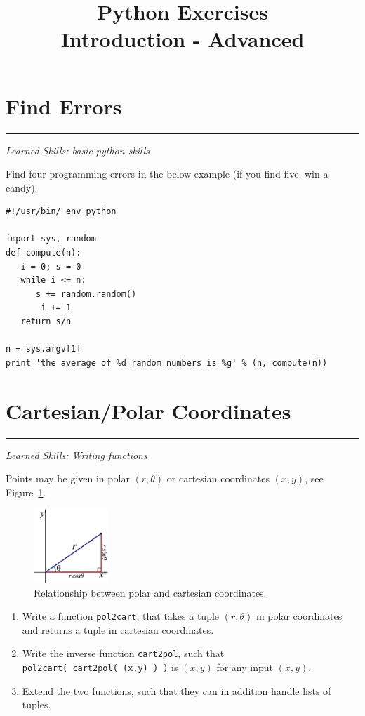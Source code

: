 \documentclass[smallheadings,12pt]{scrartcl}
\newcommand{\skills}[1]{\rule{1cm}{0pt}{\begin{minipage}{.8\textwidth}\small\em
      Learned Skills:  #1\end{minipage}}}
\begin{document}
\parindent0cm
\title{Python Exercises\\ Introduction - Advanced}
\lstset{language=Python,numbers=left,frame=shadowbox}
\date{}
\maketitle

\section{Find Errors}
\skills{basic python skills}

Find four programming errors in the below example (if you find five,
win a candy).
\begin{lstlisting}
#!/usr/bin/ env python

import sys, random
def compute(n):
   i = 0; s = 0
   while i <= n:
      s += random.random()
       i += 1
   return s/n

n = sys.argv[1]
print 'the average of %d random numbers is %g' % (n, compute(n))
\end{lstlisting}


\section{Cartesian/Polar Coordinates}
\skills{Writing functions}

Points may be given in polar $(r,\theta)$ or cartesian coordinates
$(x,y)$, see Figure~\ref{fig:pol2cart}.
\begin{figure}[H]
  \centering
  \includegraphics[width=0.25\textwidth]{pics/pol2cart.eps}
  \caption{Relationship between polar and cartesian coordinates.\label{fig:pol2cart}}
\end{figure}

\begin{enumerate}
\item Write a function \texttt{pol2cart}, that takes a tuple $(r,\theta)$ in polar
  coordinates and returns a tuple in cartesian coordinates. 
\item Write the inverse function \texttt{cart2pol}, such that {\tt
  pol2cart(~cart2pol(~(x,y)~)~)} is $(x,y)$ for any input $(x,y)$.
\item Extend the two functions, such that they can in addition handle
  lists of tuples.
\end{enumerate}
\end{document}
